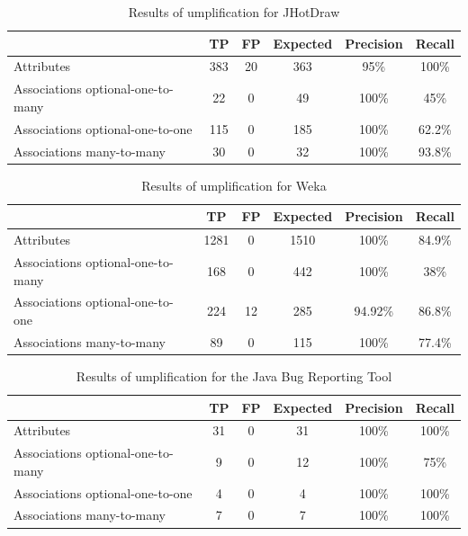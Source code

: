\begin{table}[h]
\caption{Results of umplification for JHotDraw}
\label{table:umplifiedResultsSystems1}
\centering 
\begin{tabularx}{\textwidth}{l|ccccc}
\toprule
\rowcolor[HTML]{BBDAFF}
\textbf{} & \textbf{TP}  & \textbf{FP} & \textbf{Expected} & \textbf{Precision}  & \textbf{Recall}\\ \hline
Attributes & 383  & 20  & 363  & 95\% & 100\% \\ \hline
Associations optional-one-to-many &  22 & 0 & 49 & 100\% & 45\% \\
Associations optional-one-to-one &  115 & 0 & 185  & 100\% & 62.2\% \\ 
Associations many-to-many & 30 & 0 & 32 & 100\% & 93.8\%\\ 
\end{tabularx}
\end{table}

\begin{table}[h]
\caption{Results of umplification for Weka}
\label{table:umplifiedResultsSystems2}
\begin{tabularx}{\textwidth}{l|ccccc}
\toprule
\rowcolor[HTML]{BBDAFF}
\textbf{} & \textbf{TP}  & \textbf{FP}  & \textbf{Expected} & \textbf{Precision}  & \textbf{Recall}\\ \hline
Attributes & 1281	& 0	& 1510 & 100\%	& 84.9\% \\ \hline
Associations optional-one-to-many &  168 & 0 & 442 & 100\% & 38\% \\
Associations optional-one-to-one &  224 & 12 & 285 & 94.92\%  & 86.8\% \\ 
Associations many-to-many & 89 & 0 & 115 & 100\% & 77.4\% \\ 
\end{tabularx}
\end{table}

\begin{table}[h]
\caption{Results of umplification for the Java Bug Reporting Tool}
\label{table:umplifiedResultsSystems3}
\begin{tabularx}{\textwidth}{l|ccccc}
\toprule
\rowcolor[HTML]{BBDAFF}
\textbf{} & \textbf{TP}  & \textbf{FP}  & \textbf{Expected} & \textbf{Precision}  & \textbf{Recall}\\ \hline
Attributes & 31 & 0  & 31  & 100\% & 100\% \\ \hline
Associations optional-one-to-many &  9 & 0 & 12  & 100\%& 75\% \\
Associations optional-one-to-one &  4  & 0 & 4  & 100\% & 100\% \\ 
Associations many-to-many & 7 & 0 & 7 & 100\% & 100\%\\ 
\end{tabularx}
\end{table}

